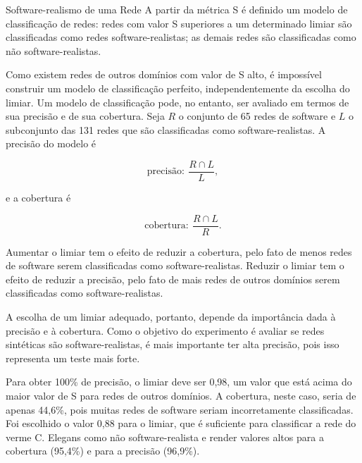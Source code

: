 \begin{section}{Software-realismo de uma Rede}
A partir da métrica S é definido um modelo de classificação de redes: redes com valor S superiores a um determinado limiar são classificadas como redes software-realistas; as demais redes são classificadas como não software-realistas.

Como existem redes de outros domínios com valor de S alto, é impossível construir um modelo de classificação perfeito, independentemente da escolha do limiar. Um modelo de classificação pode, no entanto, ser avaliado em termos de sua precisão e de sua cobertura. Seja $R$ o conjunto de 65 redes de software e $L$ o subconjunto das 131 redes que são classificadas como software-realistas. A precisão do modelo é

$$
\mbox{precisão}: ~\frac{R \cap L}{L},
$$

e a cobertura é

$$
\mbox{cobertura}: ~\frac{R \cap L}{R}.
$$

Aumentar o limiar tem o efeito de reduzir a cobertura, pelo fato de menos redes de software serem classificadas como software-realistas. Reduzir o limiar tem o efeito de reduzir a precisão, pelo fato de mais redes de outros domínios serem classificadas como software-realistas.

A escolha de um limiar adequado, portanto, depende da importância dada à precisão e à cobertura. Como o objetivo do experimento é avaliar se redes sintéticas são software-realistas, é mais importante ter alta precisão, pois isso representa um teste mais forte.

Para obter 100\% de precisão, o limiar deve ser 0,98, um valor que está acima do maior valor de S para redes de outros domínios. A cobertura, neste caso, seria de apenas 44,6\%, pois muitas redes de software seriam incorretamente classificadas. Foi escolhido o valor 0,88 para o limiar, que é suficiente para classificar a rede do verme C. Elegans como não software-realista e render valores altos para a cobertura (95,4\%) e para a precisão (96,9\%).

\end{section}

